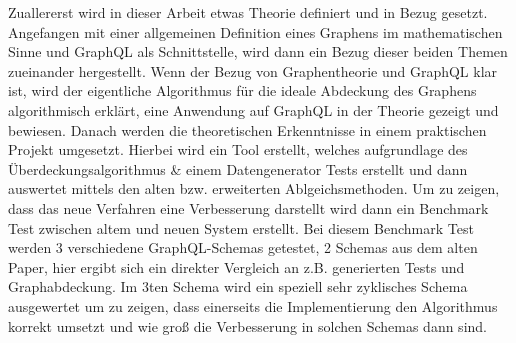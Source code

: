 Zuallererst wird in dieser Arbeit etwas Theorie definiert und in Bezug gesetzt. Angefangen mit einer allgemeinen Definition
eines Graphens im mathematischen Sinne und GraphQL als Schnittstelle, wird dann ein Bezug dieser beiden Themen
zueinander hergestellt. Wenn der Bezug von Graphentheorie und GraphQL klar ist, wird der eigentliche Algorithmus für die
ideale Abdeckung des Graphens algorithmisch erklärt, eine Anwendung auf GraphQL in der Theorie gezeigt und bewiesen.
Danach werden die theoretischen Erkenntnisse in einem praktischen Projekt umgesetzt. Hierbei wird ein Tool erstellt,
welches aufgrundlage des Überdeckungsalgorithmus & einem Datengenerator Tests erstellt und dann auswertet mittels
den alten bzw. erweiterten Ablgeichsmethoden. Um zu zeigen, dass das neue Verfahren eine Verbesserung darstellt wird dann
ein Benchmark Test zwischen altem und neuen System erstellt. Bei diesem Benchmark Test werden 3 verschiedene
GraphQL-Schemas getestet, 2 Schemas aus dem alten Paper, hier ergibt sich ein direkter Vergleich an z.B. generierten Tests und
Graphabdeckung. Im 3ten Schema wird ein speziell sehr zyklisches Schema ausgewertet um zu zeigen, dass einerseits die Implementierung
den Algorithmus korrekt umsetzt und wie groß die Verbesserung in solchen Schemas dann sind.
